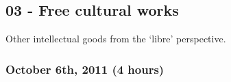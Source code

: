 \documentclass[a4paper]{article}
\begin{document}









\subsection{03 - Free cultural works}

Other intellectual goods from the `libre' perspective.


\subsubsection{October 6th, 2011 (4 hours)}
\end{document}
